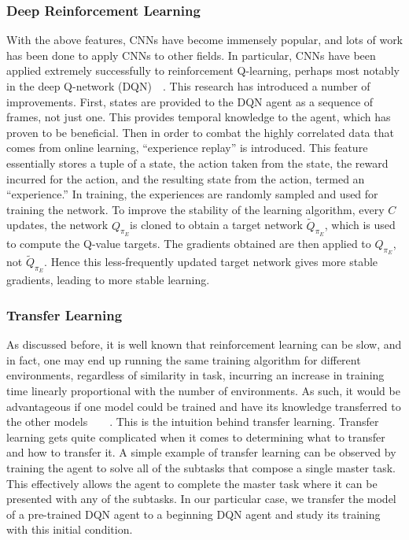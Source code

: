 \documentclass[twocolumn]{article}
\begin{document}
	\subsubsection*{Deep Reinforcement Learning}
	With the above features, CNNs have become immensely popular, and lots of 
	work has been done to apply CNNs to other fields. In particular, CNNs have 
	been applied extremely successfully to reinforcement Q-learning, perhaps 
	most notably in the deep Q-network 	(DQN)~\cite{Mnih}~\cite{Mnih2}. This 
	research has introduced a number of improvements. First, states are 
	provided to the DQN agent as a sequence of frames, not just one. This 
	provides temporal knowledge to the agent, which has proven to be 
	beneficial. Then in order to combat the highly correlated data that comes 
	from online learning, ``experience replay'' is introduced. This feature 
	essentially stores a tuple of a state, the action taken from the 
	state, the reward incurred for the action, and the
	resulting state from the action, termed an ``experience.'' In training, the 
	experiences are randomly sampled and used for training the network. To 
	improve the stability of the learning algorithm, every $C$ updates, the 
	network $Q_{\pi_E}$is cloned to obtain a target network 
	$\tilde{Q}_{\pi_E}$, which is used to compute the Q-value targets. The 
	gradients obtained are then applied to $Q_{\pi_E}$, not 
	$\tilde{Q}_{\pi_E}$. Hence this less-frequently updated target network 
	gives more stable gradients, leading to more stable learning. \\
	
	\subsubsection*{Transfer Learning}
	As discussed before, it is well known that reinforcement learning can be 
	slow, and in fact, one may end up running the same training algorithm for 
	different environments, regardless of similarity in task, incurring an 
	increase in training time linearly proportional with the number of 
	environments. As such, it would be advantageous if one model could be 
	trained and have its knowledge transferred to the other 	
	models~\cite{Taylor}~\cite{Fang}~\cite{Wei}~\cite{Yin}. This is the 
	intuition behind transfer learning. Transfer learning gets quite 
	complicated when it comes to determining what to transfer and how to 
	transfer it. A simple example of transfer learning can be observed by 
	training the agent to solve all of the subtasks that compose a single 
	master task. This effectively allows the agent to complete the master task 
	where it can be presented with any of the subtasks. In our particular case, 
	we transfer the model of a pre-trained DQN agent to a beginning DQN agent 
	and study its training with this initial condition.\\
	
\end{document}
